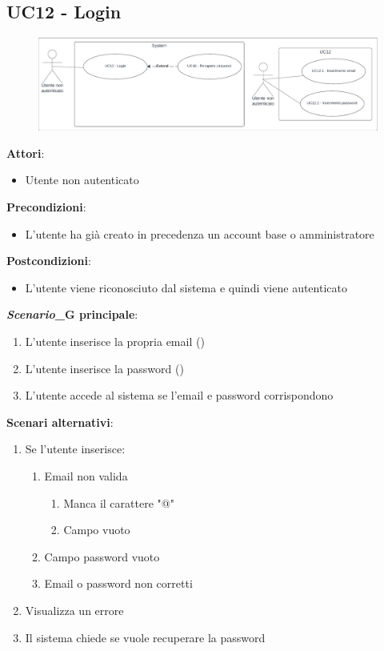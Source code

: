 \subsection{UC12 - Login} \label{usecase:12}
\begin{figure}[H]
    \centering
    \includegraphics[width=0.9\linewidth]{ucd/ucd12.png}
\end{figure}
\textbf{Attori}:
\begin{itemize}
    \item Utente non autenticato
\end{itemize}
\textbf{Precondizioni}:
\begin{itemize}
    \item L'utente ha già creato in precedenza un account base o amministratore
\end{itemize}
\textbf{Postcondizioni}:
\begin{itemize}
    \item L'utente viene riconosciuto dal sistema e quindi viene autenticato
\end{itemize}
\textbf{\textit{Scenario}_G principale}:
\begin{enumerate}
    \item L'utente inserisce la propria email ()
    \item L'utente inserisce la password ()
    \item L'utente accede al sistema se l'email e password corrispondono
\end{enumerate}
\textbf{Scenari alternativi}:
\begin{enumerate}
    \item Se l'utente inserisce:
    \begin{enumerate}
        \item Email non valida
        \begin{enumerate}
            \item Manca il carattere "@"
            \item Campo vuoto
        \end{enumerate}
        \item Campo password vuoto
        \item Email o password non corretti
    \end{enumerate}
    \item Visualizza un errore
    \item Il sistema chiede se vuole recuperare la password
\end{enumerate}